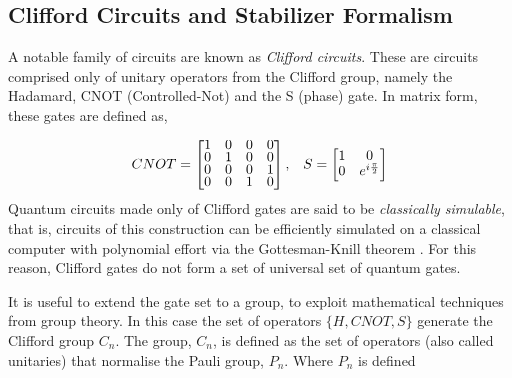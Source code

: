 \subsection{Clifford Circuits and Stabilizer Formalism}
A notable family of circuits are known as \textit{Clifford circuits}. These are circuits comprised only of unitary operators
from the Clifford group, namely the Hadamard, CNOT (Controlled-Not) and the S (phase) gate. In matrix form, these gates are defined as,

\begin{align}
    \label{CNOT}
    CNOT =
    \renewcommand{\arraystretch}{0.75}
    \begin{bmatrix}
        1 & 0 & 0 & 0 \\
        0 & 1 & 0 & 0 \\
        0 & 0 & 0 & 1 \\
        0 & 0 & 1 & 0
    \end{bmatrix},
     &  & S =
    \begin{bmatrix}
        1 & 0                  \\
        0 & e^{i\frac{\pi}{2}}
    \end{bmatrix}
\end{align}
Quantum circuits made only of Clifford gates are said to be \textit{classically simulable}, that is, circuits of this construction can be efficiently
simulated on a classical computer with polynomial effort via the Gottesman-Knill theorem \cite{knillGottesman}. For this reason, Clifford gates do not form
a set of universal set of quantum gates.

It is useful to extend the gate set to a group, to exploit mathematical techniques from group theory.
In this case the set of operators $\{H, CNOT, S\}$ generate the Clifford group $C_n$. The group, $C_n$,
is defined as the set of operators (also called unitaries) that normalise the Pauli group, $P_n$. Where
$P_n$ is defined


